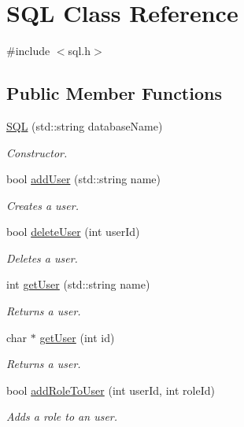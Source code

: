 \hypertarget{class_s_q_l}{}\section{S\+QL Class Reference}
\label{class_s_q_l}


{\ttfamily \#include $<$sql.\+h$>$}

\subsection*{Public Member Functions}
\begin{DoxyCompactItemize}
\item 
\hyperlink{class_s_q_l_a7c4e2325de3976159cabc406ad8c962d}{S\+QL} (std\+::string database\+Name)
\begin{DoxyCompactList}\small\item\em Constructor. \end{DoxyCompactList}\item 
bool \hyperlink{class_s_q_l_ad598892914c6cb227f30cf672427f572}{add\+User} (std\+::string name)
\begin{DoxyCompactList}\small\item\em Creates a user. \end{DoxyCompactList}\item 
bool \hyperlink{class_s_q_l_af6d3aa26b727b7667e8e286c4640733d}{delete\+User} (int user\+Id)
\begin{DoxyCompactList}\small\item\em Deletes a user. \end{DoxyCompactList}\item 
int \hyperlink{class_s_q_l_a6b6a6875d9c65febbe11ac6b8d682d83}{get\+User} (std\+::string name)
\begin{DoxyCompactList}\small\item\em Returns a user. \end{DoxyCompactList}\item 
char $\ast$ \hyperlink{class_s_q_l_a9fc827b22291dd167b9ee952eb278fd6}{get\+User} (int id)
\begin{DoxyCompactList}\small\item\em Returns a user. \end{DoxyCompactList}\item 
bool \hyperlink{class_s_q_l_a3c6333842b20b930924e655f12a3dd66}{add\+Role\+To\+User} (int user\+Id, int role\+Id)
\begin{DoxyCompactList}\small\item\em Adds a role to an user. \end{DoxyCompactList}\item 

\end{DoxyCompactItemize}
